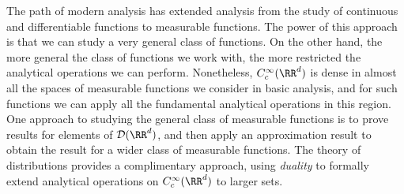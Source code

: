 The path of modern analysis has extended analysis from the study of continuous and differentiable functions to measurable functions. The power of this approach is that we can study a very general class of functions. On the other hand, the more general the class of functions we work with, the more restricted the analytical operations we can perform. Nonetheless, $C^\infty_c(\RR^d)$ is dense in almost all the spaces of measurable functions we consider in basic analysis, and for such functions we can apply all the fundamental analytical operations in this region. One approach to studying the general class of measurable functions is to prove results for elements of $\mathcal{D}(\RR^d)$, and then apply an approximation result to obtain the result for a wider class of measurable functions. The theory of distributions provides a complimentary approach, using \emph{duality} to formally extend analytical operations on $C^\infty_c(\RR^d)$ to larger sets.

